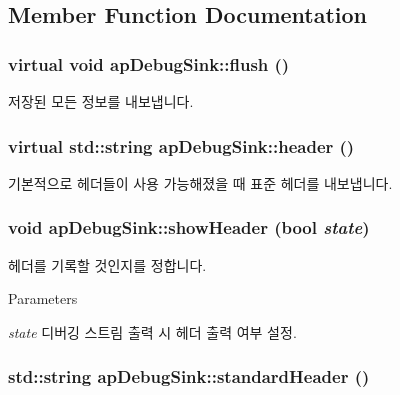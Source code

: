 \subsection{Member Function Documentation}
\hypertarget{classapDebugSink_a7d7ff2d4974665a43a996ab5d245de6b}{
\subsubsection[{flush}]{\setlength{\rightskip}{0pt plus 5cm}virtual void apDebugSink::flush ()}}
\label{classapDebugSink_a7d7ff2d4974665a43a996ab5d245de6b}
저장된 모든 정보를 내보냅니다. \hypertarget{classapDebugSink_aae1dd83c95adcdc4d7ede36ae5c79287}{
\subsubsection[{header}]{\setlength{\rightskip}{0pt plus 5cm}virtual std::string apDebugSink::header ()}}
\label{classapDebugSink_aae1dd83c95adcdc4d7ede36ae5c79287}
기본적으로 헤더들이 사용 가능해졌을 때 표준 헤더를 내보냅니다. \hypertarget{classapDebugSink_a5f4db9dc661bfb26196f0d08b8f58f39}{
\subsubsection[{showHeader}]{\setlength{\rightskip}{0pt plus 5cm}void apDebugSink::showHeader (bool {\em state})}}
\label{classapDebugSink_a5f4db9dc661bfb26196f0d08b8f58f39}
헤더를 기록할 것인지를 정합니다. 
\begin{DoxyParams}{Parameters}
\item[{\em state}]디버깅 스트림 출력 시 헤더 출력 여부 설정. \end{DoxyParams}
\hypertarget{classapDebugSink_a0481b649618d6e167565ed0f7d36f27d}{
\subsubsection[{standardHeader}]{\setlength{\rightskip}{0pt plus 5cm}std::string apDebugSink::standardHeader ()}}

